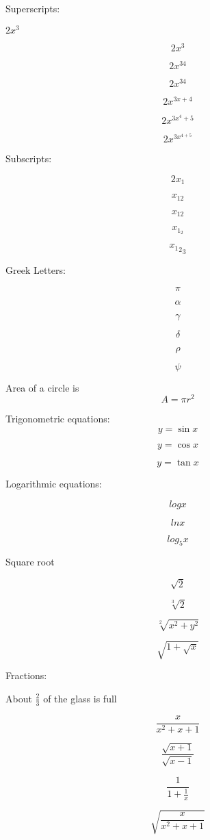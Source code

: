 \documentclass[11pt]{article}
\begin{document}
Superscripts:

$2x^3$

$$2x^3$$

$$ 2x^34 $$

$$ 2x^{34} $$

$$  2x^{3x + 4} $$

$$ 2x^{3x^4 + 5} $$

$$ 2x^{3x^{4 + 5}} $$


Subscripts:

$$ 2x_1 $$

$$ x_{12} $$

$$ x_12 $$

$$ x_{1_2} $$

$$ {{x_1}_2}_3 $$


Greek Letters:

$$ \pi $$

$$ \alpha $$

$$ \gamma $$

$$ \delta $$

$$ \rho $$

$$ \psi $$

Area of a circle is $$ A = \pi r^2 $$

Trigonometric equations:
 $$ y = \sin{x} $$
 
 $$ y = \cos{x} $$

 $$ y = \tan{x} $$
 
Logarithmic equations:

$$ log{x} $$

$$ ln{x} $$

$$ {log_{5}}{x} $$

Square root

$$ \sqrt{2} $$

$$ \sqrt[3]{2} $$

$$ \sqrt[2]{x^2 + y^2} $$

$$ \sqrt{1 + \sqrt{x} } $$

Fractions:

About $ \displaystyle{\frac{2}{3}} $ of the glass is full

$$ \frac{x}{x^2 + x + 1} $$

$$ \frac{\sqrt{x + 1}}{\sqrt{x-1}} $$

$$ \frac{1}{ 1 + \frac{1}{x}} $$

$$ \sqrt{\frac{x}{x^2 + x + 1}} $$
\end{document}
